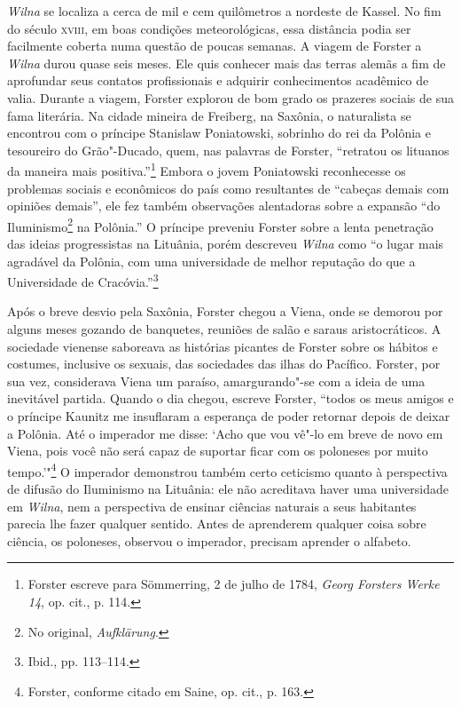 \textit{Wilna} se localiza a cerca de mil e cem quilômetros a nordeste de Kassel. No
fim do século \textsc{xviii}, em boas condições meteorológicas, essa distância podia
ser facilmente coberta numa questão de poucas semanas. A viagem de
Forster a \textit{Wilna} durou quase seis meses. Ele quis conhecer mais das
terras alemãs a fim de aprofundar seus contatos profissionais e adquirir
conhecimentos acadêmico de valia. Durante a viagem, Forster explorou de
bom grado os prazeres sociais de sua fama literária. Na cidade mineira
de Freiberg, na Saxônia, o naturalista se encontrou com o príncipe
Stanislaw Poniatowski, sobrinho do rei da Polônia e tesoureiro
do Grão"-Ducado, quem, nas palavras de Forster, ``retratou os lituanos da
maneira mais positiva.''\footnote{Forster escreve para Sömmerring, 2 de julho de 1784, \textit{Georg Forsters Werke 14}, op. cit., p. 114.} Embora o jovem Poniatowski reconhecesse os problemas sociais e
econômicos do país como resultantes de ``cabeças demais com opiniões
demais'', ele fez também observações alentadoras sobre a expansão ``do
Iluminismo\footnote{No original, \textit{Aufklärung}.} na Polônia.'' O príncipe preveniu
Forster sobre a lenta penetração das ideias progressistas na Lituânia,
porém descreveu \textit{Wilna} como ``o lugar mais agradável da Polônia, com uma
universidade de melhor reputação do que a Universidade de
Cracóvia.''\footnote{Ibid., pp. 113--114.}

Após o breve desvio pela Saxônia, Forster chegou a Viena, onde se
demorou por alguns meses gozando de banquetes, reuniões de salão e
saraus aristocráticos. A sociedade vienense saboreava as histórias
picantes de Forster sobre os hábitos e costumes, inclusive os sexuais,
das sociedades das ilhas do Pacífico. Forster, por sua vez, considerava
Viena um paraíso, amargurando"-se com a ideia de uma inevitável partida.
Quando o dia chegou, escreve Forster, ``todos os meus amigos e o
príncipe Kaunitz me insuflaram a esperança de poder retornar
depois de deixar a Polônia. Até o imperador me disse: `Acho que vou
vê"-lo em breve de novo em Viena, pois você não será capaz de suportar
ficar com os poloneses por muito tempo.'"\footnote{Forster, conforme citado em Saine, op. cit., p. 163.} O imperador demonstrou também certo ceticismo quanto à perspectiva de difusão do Iluminismo na
Lituânia: ele não acreditava haver uma universidade em \textit{Wilna}, nem a
perspectiva de ensinar ciências naturais a seus habitantes parecia lhe
fazer qualquer sentido. Antes de aprenderem qualquer coisa sobre
ciência, os poloneses, observou o imperador, precisam aprender o
alfabeto.

